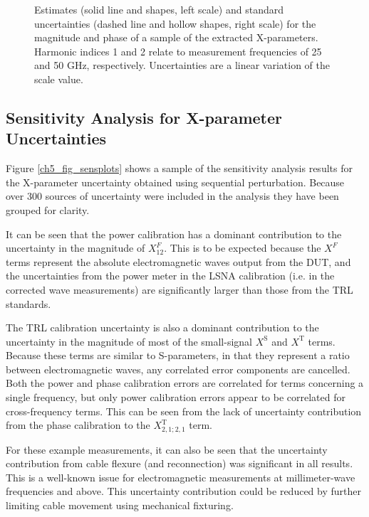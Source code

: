 \documentclass[../thesis/thesis.tex]{subfiles}
\begin{document}
\begin{figure}
\begin{subfigure}{0.45\textwidth}
		\label{ch5_fig_t212kp}
	\end{subfigure}
	\caption[Estimates and standard uncertainties for the magnitude and phase of a sample of the extracted X-parameters.]{Estimates (solid line and shapes, left scale) and standard uncertainties (dashed line and hollow shapes, right scale) for the magnitude and phase of a sample of the extracted X-parameters. Harmonic indices 1 and 2 relate to measurement frequencies of 25 and 50 GHz, respectively. Uncertainties are a linear variation of the scale value.}
	\label{ch5_fig_summaryplots}
\end{figure}

\subsection{Sensitivity Analysis for X-parameter Uncertainties}

Figure \ref{ch5_fig_sensplots} shows a sample of the sensitivity analysis results for the X-parameter uncertainty obtained using sequential perturbation. Because over 300 sources of uncertainty were included in the analysis they have been grouped for clarity.

It can be seen that the power calibration has a dominant contribution to the uncertainty in the magnitude of $X^F_{12}$. This is to be expected because the $X^F$ terms represent the absolute electromagnetic waves output from the DUT, and the uncertainties from the power meter in the LSNA calibration (i.e. in the corrected wave measurements) are significantly larger than those from the TRL standards.

The TRL calibration uncertainty is also a dominant contribution to the uncertainty in the magnitude of most of the small-signal $X^\textrm{S}$ and $X^\textrm{T}$ terms. Because these terms are similar to S-parameters, in that they represent a ratio between electromagnetic waves, any correlated error components are cancelled. Both the power and phase calibration errors are correlated for terms concerning a single frequency, but only power calibration errors appear to be correlated for cross-frequency terms. This can be seen from the lack of uncertainty contribution from the phase calibration to the $X^\textrm{T}_{2,1;2,1}$ term.

For these example measurements, it can also be seen that the uncertainty contribution from cable flexure (and reconnection) was significant in all results. This is a well-known issue for electromagnetic measurements at millimeter-wave frequencies and above. This uncertainty contribution could be reduced by further limiting cable movement using mechanical fixturing.
\end{document}

